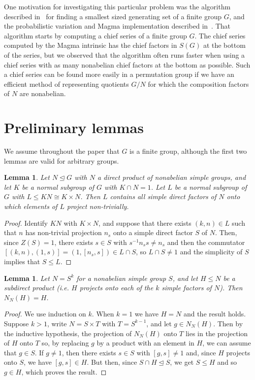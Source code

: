 \documentclass[12pt,a4paper]{article}
\newtheorem{lemma}[theorem]{Lemma} %
\begin{document}
One motivation for investigating this particular problem was the algorithm
described in~\cite{LT} for finding a smallest sized generating set of a finite
group $G$, and the probabilistic variation and Magma implementation described
in~\cite{HT}. That algorithm starts by computing a chief series of a finite
group $G$. The chief series computed by the Magma intrinsic has the
chief factors in $S(G)$ at the bottom of the series, but we observed that
the algorithm often runs faster when using a chief series with as many
nonabelian chief factors at the bottom as possible. Such a chief series can be
found more easily in a permutation group if we have an efficient method
of representing quotients $G/N$ for which the composition factors of $N$ are
nonabelian.

\section{Preliminary lemmas}
We assume throughout the paper that $G$ is a finite group,
although the first two lemmas are valid for arbitrary groups.

\begin{lemma}\label{lem:ntproj}
Let $N \unlhd G$ with $N$ a direct product of nonabelian
simple groups,
and let $K$ be a normal subgroup of $G$ with $K \cap N = 1$. Let $L$ be a normal
subgroup of $G$ with $L \le KN \cong K \times N$. Then $L$ contains all simple
direct factors of $N$ onto which elements of $L$ project non-trivially.
\end{lemma}
\begin{proof} Identify $KN$ with $K \times N$, and suppose that
there exists $(k,n) \in L$ such that $n$ has non-trivial projection $n_s$ onto
a simple direct factor $S$ of $N$. Then, since $Z(S) = 1$, there exists
$s \in S$ with $s^{-1}n_s s \ne n_s$ and then the commutator $[(k,n),(1,s)]
= (1,[n_s,s]) \in L \cap S$, so $L \cap S \ne 1$ and the simplicity of $S$
implies that $S \le L$.
\end{proof}

\begin{lemma}\label{lem:normsd}
Let $N = S^k$ for a nonabelian simple group $S$, and let
$H \le N$ be a subdirect product (i.e. $H$ projects onto each of the
$k$ simple factors of $N$). Then $N_N(H)=H$.
\end{lemma}
\begin{proof} We use induction on $k$. When $k=1$ we have $H=N$ and the result
holds. Suppose $k>1$, write $N = S \times T$ with $T = S^{k-1}$, and let
$g \in N_N(H)$. Then by the inductive hypothesis, the projection of $N_N(H)$
onto $T$ lies in the projection of $H$ onto $T$ so, by replacing $g$ by a
product with an element in $H$, we can assume that $g \in S$. If $g \ne 1$,
then there exists $s \in S$ with $[g,s] \ne 1$ and, since $H$ projects onto $S$,
 we have $[g,s] \in H$. But then, since $S \cap H \unlhd S$,
we get $S \le H$ and so $g \in H$, which proves the result.
\end{proof}
\end{document}

